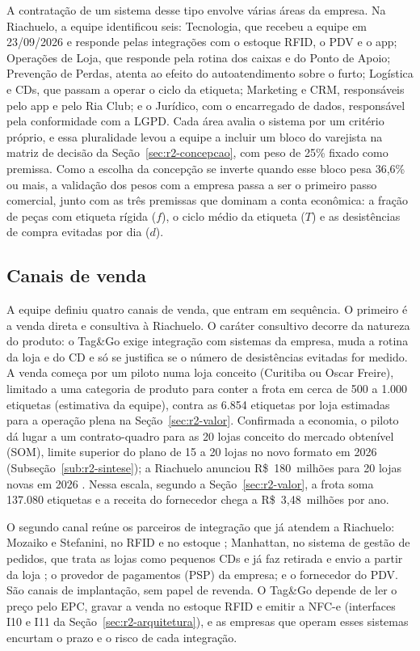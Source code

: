 A contratação de um sistema desse tipo envolve várias áreas da empresa. Na Riachuelo, a equipe identificou seis: Tecnologia, que recebeu a equipe em 23/09/2026 e responde pelas integrações com o estoque RFID, o PDV e o app; Operações de Loja, que responde pela rotina dos caixas e do Ponto de Apoio; Prevenção de Perdas, atenta ao efeito do autoatendimento sobre o furto; Logística e CDs, que passam a operar o ciclo da etiqueta; Marketing e CRM, responsáveis pelo app e pelo Ria Club; e o Jurídico, com o encarregado de dados, responsável pela conformidade com a LGPD. Cada área avalia o sistema por um critério próprio, e essa pluralidade levou a equipe a incluir um bloco do varejista na matriz de decisão da Seção~\ref{sec:r2-concepcao}, com peso de 25\% fixado como premissa. Como a escolha da concepção se inverte quando esse bloco pesa 36,6\% ou mais, a validação dos pesos com a empresa passa a ser o primeiro passo comercial, junto com as três premissas que dominam a conta econômica: a fração de peças com etiqueta rígida ($f$), o ciclo médio da etiqueta ($T$) e as desistências de compra evitadas por dia ($d$).

\subsection{Canais de venda}
\label{sub:r2-canais}

A equipe definiu quatro canais de venda, que entram em sequência. O primeiro é a venda direta e consultiva à Riachuelo. O caráter consultivo decorre da natureza do produto: o Tag\&Go exige integração com sistemas da empresa, muda a rotina da loja e do CD e só se justifica se o número de desistências evitadas for medido. A venda começa por um piloto numa loja conceito (Curitiba ou Oscar Freire), limitado a uma categoria de produto para conter a frota em cerca de 500 a 1.000 etiquetas (estimativa da equipe), contra as 6.854 etiquetas por loja estimadas para a operação plena na Seção~\ref{sec:r2-valor}. Confirmada a economia, o piloto dá lugar a um contrato-quadro para as 20 lojas conceito do mercado obtenível (SOM), limite superior do plano de 15 a 20 lojas no novo formato em 2026 (Subseção~\ref{sub:r2-sintese}); a Riachuelo anunciou R\$~180~milhões para 20 lojas novas em 2026 \cite{exame2026riachuelo}. Nessa escala, segundo a Seção~\ref{sec:r2-valor}, a frota soma 137.080 etiquetas e a receita do fornecedor chega a R\$~3,48~milhões por ano.

O segundo canal reúne os parceiros de integração que já atendem a Riachuelo: Mozaiko e Stefanini, no RFID e no estoque \cite{tiinside2022riachuelo}; Manhattan, no sistema de gestão de pedidos, que trata as lojas como pequenos CDs e já faz retirada e envio a partir da loja \cite{manhattan2026riachuelo}; o provedor de pagamentos (PSP) da empresa; e o fornecedor do PDV. São canais de implantação, sem papel de revenda. O Tag\&Go depende de ler o preço pelo EPC, gravar a venda no estoque RFID e emitir a NFC-e (interfaces I10 e I11 da Seção~\ref{sec:r2-arquitetura}), e as empresas que operam esses sistemas encurtam o prazo e o risco de cada integração.

